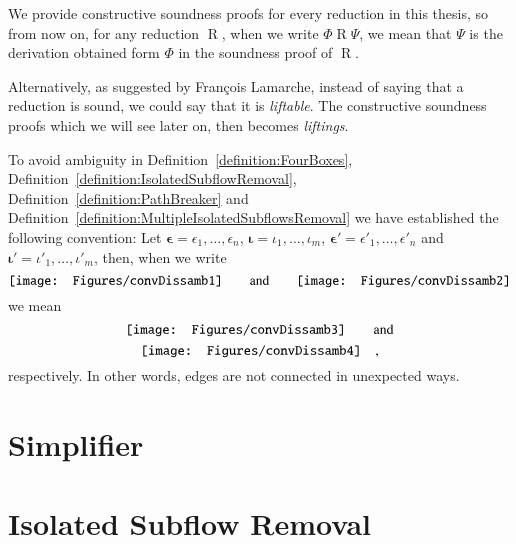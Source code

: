 \begin{convention}
We provide constructive soundness proofs for every reduction in this thesis, so from now on, for any reduction $\mathrel{R}$, when we write $\Phi\mathrel{R}\Psi$, we mean that $\Psi$ is the derivation obtained form $\Phi$ in the soundness proof of $\mathrel{R}$.
\end{convention}

\begin{remark}\label{remark:lifting}
Alternatively, as suggested by Fran\c{c}ois Lamarche, instead of saying that a reduction is sound, we could say that it is \emph{liftable}. The constructive soundness proofs which we will see later on, then becomes \emph{liftings}.
\end{remark}

\begin{convention}
To avoid ambiguity in Definition~\vref{definition:FourBoxes}, Definition~\vref{definition:IsolatedSubflowRemoval}, Definition~\vref{definition:PathBreaker} and Definition~\vref{definition:MultipleIsolatedSubflowsRemoval} we have established the following convention:
Let $\boldsymbol\epsilon=\epsilon_1,\dots,\epsilon_n$, $\boldsymbol\iota=\iota_1,\dots,\iota_m$, $\boldsymbol{\epsilon'}=\epsilon'_1,\dots,\epsilon'_n$ and $\boldsymbol{\iota'}=\iota'_1,\dots,\iota'_m$, then, when we write
\[
\vcenter{\hbox{\texttt{[image: Figures/convDissamb1]}}}
\qquad\mbox{and}\qquad
\vcenter{\hbox{\texttt{[image: Figures/convDissamb2]}}}
\]
we mean
\[
\vcenter{\hbox{\texttt{[image: Figures/convDissamb3]}}}
\qquad\mbox{and}
\]
\[
\vcenter{\hbox{\texttt{[image: Figures/convDissamb4]}}}
\quad,
\]
respectively. In other words, edges are not connected in unexpected ways.
\end{convention}

\section{Simplifier}\label{section:Simplifier}



\section{Isolated Subflow Removal}\label{section:IsolatedSubflowRemoval}

